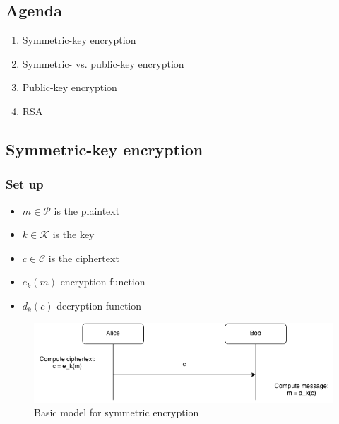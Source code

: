 

\subsection*{Agenda}
\begin{enumerate}
\item Symmetric-key encryption
\item Symmetric- vs. public-key encryption
\item Public-key encryption
\item RSA
\end{enumerate}

\subsection{Symmetric-key encryption}
\subsubsection*{Set up}
\begin{itemize}
\item $m \in \mathcal{P}$ is the plaintext
\item $k \in \mathcal{K}$ is the key
\item $c \in \mathcal{C}$ is the ciphertext
\item $e_k(m)$ encryption function
\item $d_k(c)$ decryption function
\end{itemize}

\begin{figure}[H]
  \begin{centering}
    \includegraphics[width=15cm]{images/1-sym-enc}
    \caption{Basic model for symmetric encryption}
  \end{centering}
  \label{fig:sym-enc}
\end{figure}


